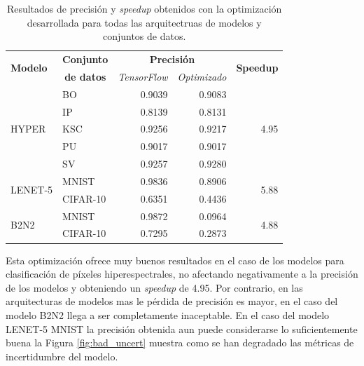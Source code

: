 \begin{table}[h]
    \centering
    \caption{Resultados de precisión y \textit{speedup} obtenidos con la optimización desarrollada para todas las arquitectruas de modelos y conjuntos de datos.}
    \label{tab:uniform_opt}
    \begin{tabular}{llrrr}
    \hline
     \multirow{2}{*}{\textbf{Modelo}} & \textbf{Conjunto} & \multicolumn{2}{c}{\textbf{Precisión}} & \multirow{2}{*}{\textbf{Speedup}} \\
     & \multicolumn{1}{c}{\textbf{de datos}} & \multicolumn{1}{l}{\textit{TensorFlow}} & \multicolumn{1}{l}{\textit{Optimizado}} & \\ \hline
    \multirow{5}{*}{HYPER} & BO & 0.9039 & 0.9083 & \multirow{5}{*}{4.95} \\
     & IP & 0.8139 & 0.8131 & \\
     & KSC & 0.9256 & 0.9217 & \\
     & PU & 0.9017 & 0.9017 & \\
     & SV & 0.9257 & 0.9280 & \\ \hline
    \multirow{2}{*}{LENET-5} & MNIST & 0.9836 & 0.8906 & \multirow{2}{*}{5.88} \\
     & CIFAR-10 & 0.6351 & 0.4436 & \\ \hline
    \multirow{2}{*}{B2N2} & MNIST & 0.9872 & 0.0964 & \multirow{2}{*}{4.88} \\
     & CIFAR-10 & 0.7295 & 0.2873 & \\ \hline                  
    \end{tabular}
\end{table}

Esta optimización ofrece muy buenos resultados en el caso de los modelos para clasificación de píxeles hiperespectrales, no afectando negativamente a la precisión de los modelos y obteniendo un \textit{speedup} de 4.95. Por contrario, en las arquitecturas de modelos mas le pérdida de precisión es mayor, en el caso del modelo B2N2 llega a ser completamente inaceptable. En el caso del modelo LENET-5 MNIST la precisión obtenida aun puede considerarse lo suficientemente buena la Figura \ref{fig:bad_uncert} muestra como se han degradado las métricas de incertidumbre del modelo. 



